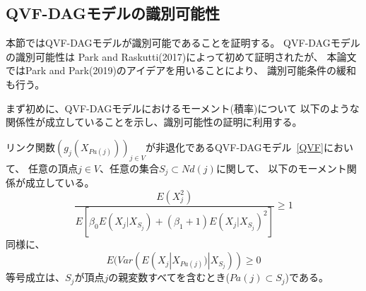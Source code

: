 
\subsection{QVF-DAGモデルの識別可能性}

本節ではQVF-DAGモデルが識別可能であることを証明する。
QVF-DAGモデルの識別可能性は
Park and Raskutti(2017)\cite{Park2017-hw}によって初めて証明されたが、
本論文ではPark and Park(2019)\cite{Park2019-qy}のアイデアを用いることにより、
識別可能条件の緩和も行う。

まず初めに、QVF-DAGモデルにおけるモーメント(積率)について
以下のような関係性が成立していることを示し、識別可能性の証明に利用する。

\begin{prop} \label{prop:MRS}
  リンク関数$(g_j(X_{Pa(j)}))_{j \in V}$が非退化であるQVF-DAGモデル~\eqref{QVF}において、
  任意の頂点$j \in V$、任意の集合$S_j \subset \mathit{Nd}(j)$に関して、
  以下のモーメント関係が成立している。
  \begin{equation}
    \frac{E(X_j^2)}
    {E \left[ \beta_0 E(X_j | X_{S_j}) + (\beta_1 + 1)E(X_j | X_{S_j})^2 \right]}
    \geq 1
    \label{eq:MRS}
  \end{equation}
  同様に、
  \begin{equation}
    E(\mathit{Var}( E(X_j | X_{Pa(j)}) | X_{S_j} )) \geq 0
  \end{equation}
  等号成立は、$S_j$が頂点$j$の親変数すべてを含むとき($Pa(j)\subset S_j$)である。
\end{prop}

